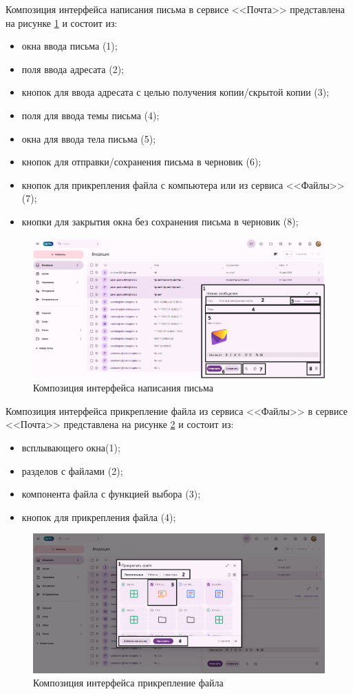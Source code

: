 Композиция интерфейса написания письма в сервисе <<Почта>> представлена на рисунке \ref{templ:image1b} и состоит из:
\begin{itemize}
  \item окна ввода письма (1);
  \item поля ввода адресата (2);
  \item кнопок для ввода адресата с целью получения копии/скрытой копии (3);
  \item поля для ввода темы письма (4);
  \item окна для ввода тела письма (5);
  \item кнопок для отправки/сохранения письма в черновик (6);
  \item кнопок для прикрепления файла с компьютера или из сервиса <<Файлы>> (7);
  \item кнопки для закрытия окна без сохранения письма в черновик (8);
\end{itemize}
\begin{figure}[H]
	\centering
	\includegraphics[width=1\linewidth]{images/почта2}
	\caption{Композиция интерфейса написания письма}
	\label{templ:image1b}
\end{figure}

Композиция интерфейса прикрепление файла из сервиса <<Файлы>> в сервисе <<Почта>> представлена на рисунке \ref{templ:image1c} и состоит из:
\begin{itemize}
  \item всплывающего окна(1);
  \item разделов с файлами (2);
  \item компонента файла с функцией выбора (3);
  \item кнопок для прикрепления файла (4);
\end{itemize}
\begin{figure}[H]
	\centering
	\includegraphics[width=1\linewidth]{images/почта3}
	\caption{Композиция интерфейса прикрепление файла}
	\label{templ:image1c}
\end{figure}

